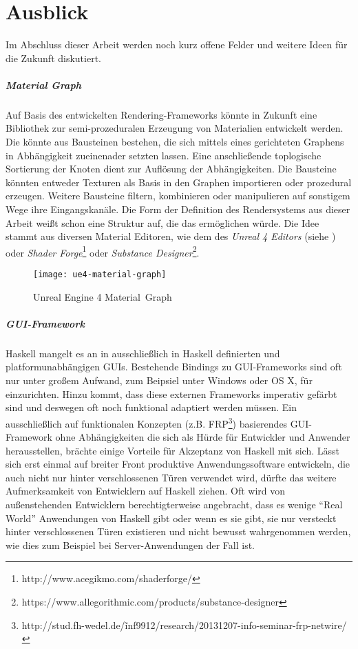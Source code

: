 \chapter{Ausblick}
\label{chap:ausblick}

Im Abschluss dieser Arbeit werden noch kurz offene Felder und weitere Ideen für die Zukunft diskutiert.

\paragraph{Material Graph} Auf Basis des entwickelten Rendering-Frameworks könnte in Zukunft eine Bibliothek zur semi-prozeduralen Erzeugung von Materialien entwickelt werden. Die könnte aus Bausteinen bestehen, die sich mittels eines gerichteten Graphens in Abhängigkeit zueinenader setzten lassen. Eine anschließende toplogische Sortierung der Knoten dient zur Auflösung der Abhängigkeiten. Die Bausteine könnten entweder Texturen als Basis in den Graphen importieren oder prozedural erzeugen. Weitere Bausteine filtern, kombinieren oder manipulieren auf sonstigem Wege ihre Eingangskanäle. Die Form der Definition des Rendersystems aus dieser Arbeit weißt schon eine Struktur auf, die das ermöglichen würde. Die Idee stammt aus diversen Material Editoren, wie dem des \textit{Unreal 4 Editors} (siehe ) oder \textit{Shader Forge}\footnote{http://www.acegikmo.com/shaderforge/} oder \textit{Substance Designer}\footnote{https://www.allegorithmic.com/products/substance-designer}.

\begin{wrapfigure}{r}{0.4\linewidth}
\centering
\texttt{[image: ue4-material-graph]}
\caption{Unreal Engine 4 \mbox{Material Graph}}\label{fig:material-graph}
\end{wrapfigure}

\paragraph{GUI-Framework}\label{sec:gui-framework} Haskell mangelt es an in ausschließlich in Haskell definierten und platformunabhängigen \acsp{GUI}. Bestehende Bindings zu \acs{GUI}-Frameworks sind oft nur unter großem Aufwand, zum Beipsiel unter Windows oder OS X, für einzurichten. Hinzu kommt, dass diese externen Frameworks imperativ gefärbt sind und deswegen oft noch funktional adaptiert werden müssen. Ein ausschließlich auf funktionalen Konzepten (z.B. \ac{FRP}\footnote{http://stud.fh-wedel.de/\~inf9912/research/20131207-info-seminar-frp-netwire/}) basierendes \acs{GUI}-Framework ohne Abhängigkeiten die sich als Hürde für Entwickler und Anwender herausstellen, brächte einige Vorteile für Akzeptanz von Haskell mit sich. Lässt sich erst einmal auf breiter Front produktive Anwendungssoftware entwickeln, die auch nicht nur hinter verschlossenen Türen verwendet wird, dürfte das weitere Aufmerksamkeit von Entwicklern auf Haskell ziehen. Oft wird von außenstehenden Entwicklern berechtigterweise angebracht, dass es wenige "`Real World"' Anwendungen von Haskell gibt oder wenn es sie gibt, sie nur versteckt hinter verschlossenen Türen existieren und nicht bewusst wahrgenommen werden, wie dies zum Beispiel bei Server-Anwendungen der Fall ist.

